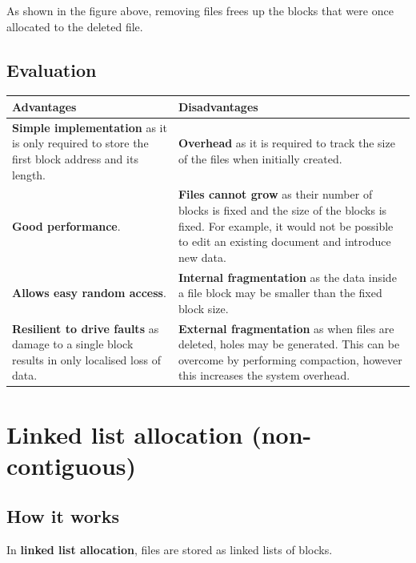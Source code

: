 \documentclass[a4paper]{systems-software}
\begin{document}
As shown in the figure above, removing files frees up the blocks that were once allocated to the deleted file.


\subsection*{Evaluation}

\begin{longtabu} to \textwidth {| X[1,l] | X[1,l] |}
    \hline
    \textbf{Advantages} & \textbf{Disadvantages}
	\\ \hline
	\textbf{Simple implementation} as it is only required to store the first block address and its length. &
	\textbf{Overhead} as it is required to track the size of the files when initially created.
	\\ \hline
	\textbf{Good performance}. &
	\textbf{Files cannot grow} as their number of blocks is fixed and the size of the blocks is fixed. For example, it would not be possible to edit an existing document and introduce new data.
	\\ \hline
	\textbf{Allows easy random access}. &
	\textbf{Internal fragmentation} as the data inside a file block may be smaller than the fixed block size.
	\\ \hline
	\textbf{Resilient to drive faults} as damage to a single block results in only localised loss of data. &
	\textbf{External fragmentation} as when files are deleted, holes may be generated. This can be overcome by performing compaction, however this increases the system overhead.
	\\ \hline
\end{longtabu}


\newpage

\section*{Linked list allocation (non-contiguous)}

\subsection*{How it works}

In \textbf{linked list allocation}, files are stored as linked lists of blocks.
\end{document}
